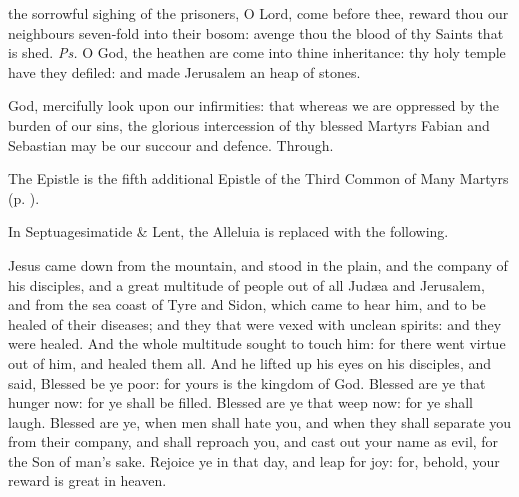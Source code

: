\clearpage
{}

\introit
{} the sorrowful sighing of the prisoners, O Lord, come before thee, reward thou our neighbours seven-fold into their bosom: avenge thou the blood of thy Saints that is shed. \textit{Ps.} O God, the heathen are come into thine inheritance: thy holy temple have they defiled: and made Jerusalem an heap of stones.

\collect
{} God, mercifully look upon our infirmities: that whereas we are oppressed by the burden of our sins, the glorious intercession of thy blessed Martyrs Fabian and Sebastian may be our succour and defence. Through.

\begin{rubric}
	The Epistle is the fifth additional Epistle of the Third Common of Many Martyrs (p. \pageref{Hebrews1133}).
\end{rubric}


\begin{rubric}
	In Septuagesimatide \& Lent, the Alleluia is replaced with the following.
\end{rubric}


 Jesus came down from the mountain, and stood in the plain, and the company of his disciples, and a great multitude of people out of all Jud{\ae}a and Jerusalem, and from the sea coast of Tyre and Sidon, which came to hear him, and to be healed of their diseases; and they that were vexed with unclean spirits: and they were healed. And the whole multitude sought to touch him: for there went virtue out of him, and healed them all. And he lifted up his eyes on his disciples, and said, Blessed be ye poor: for yours is the kingdom of God. Blessed are ye that hunger now: for ye shall be filled. Blessed are ye that weep now: for ye shall laugh. Blessed are ye, when men shall hate you, and when they shall separate you from their company, and shall reproach you, and cast out your name as evil, for the Son of man’s sake. Rejoice ye in that day, and leap for joy: for, behold, your reward is great in heaven.

